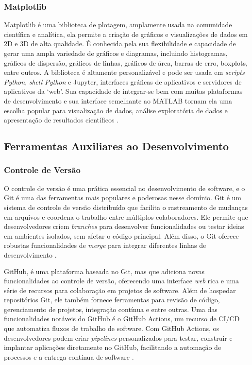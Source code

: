 \subsubsection{Matplotlib}

Matplotlib é uma biblioteca de plotagem, amplamente usada na comunidade científica e analítica, ela permite a criação de
gráficos e visualizações de dados em 2D e 3D de alta qualidade.
É conhecida pela sua flexibilidade e capacidade de gerar uma ampla variedade de gráficos e diagramas, incluindo
histogramas, gráficos de dispersão, gráficos de linhas, gráficos de área, barras de erro, boxplots, entre outros.
A biblioteca é altamente personalizável e pode ser usada em \textit{scripts Python}, \textit{shell Python} e Jupyter,
interfaces gráficas de aplicativos e servidores de aplicativos da ‘web’.
Sua capacidade de integrar-se bem com muitas plataformas de desenvolvimento e sua interface semelhante ao MATLAB tornam
ela uma escolha popular para visualização de dados, análise exploratória de dados e apresentação de resultados
científicos \cite{matplotlib}.

\subsection{Ferramentas Auxiliares ao Desenvolvimento}

\subsubsection{Controle de Versão}


O controle de versão é uma prática essencial no desenvolvimento de software, e o Git é uma das ferramentas mais
populares e poderosas nesse domínio.
Git é um sistema de controle de versão distribuído que facilita o rastreamento de mudanças em arquivos e coordena o
trabalho entre múltiplos colaboradores.
Ele permite que desenvolvedores criem \textit{branches} para desenvolver funcionalidades ou testar ideias em ambientes
isolados, sem afetar o código principal.
Além disso, o Git oferece robustas funcionalidades de \textit{merge} para integrar diferentes linhas de desenvolvimento
\cite{git}.

GitHub, é uma plataforma baseada no Git, mas que adiciona novas funcionalidades ao controle de versão, oferecendo uma
interface \textit{web} rica e uma série de recursos para colaboração em projetos de software.
Além de hospedar repositórios Git, ele também fornece ferramentas para revisão de código, gerenciamento de projetos,
integração contínua e entre outras.
Uma das funcionalidades notáveis do GitHub é o GitHub Actions, um recurso de CI/CD que automatiza fluxos de trabalho
de software.
Com GitHub Actions, os desenvolvedores podem criar \textit{pipelines} personalizados para testar, construir e implantar
aplicações diretamente no GitHub, facilitando a automação de processos e a entrega contínua de software \cite{github}.


